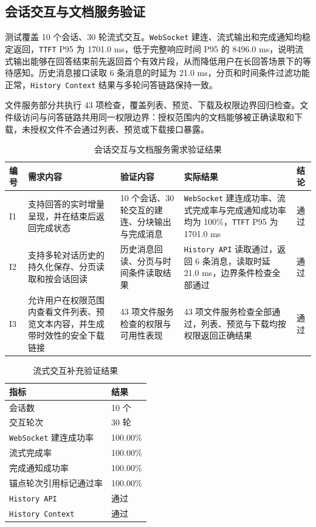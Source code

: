 \subsection{会话交互与文档服务验证}

测试覆盖 10 个会话、30 轮流式交互。\texttt{WebSocket} 建连、流式输出和完成通知均稳定返回，\texttt{TTFT} P95 为 1701.0 ms，低于完整响应时间 P95 的 8496.0 ms，说明流式输出能够在回答结束前先返回首个有效片段，从而降低用户在长回答场景下的等待感知。历史消息接口读取 6 条消息的时延为 21.0 ms，分页和时间条件过滤功能正常，\texttt{History Context} 结果与多轮问答链路保持一致。

文件服务部分共执行 43 项检查，覆盖列表、预览、下载及权限边界回归检查。文件级访问与问答链路共用同一权限边界：授权范围内的文档能够被正确读取和下载，未授权文件不会通过列表、预览或下载接口暴露。

\begin{table}[!htbp]
    \centering
    \caption{会话交互与文档服务需求验证结果}
    \label{tab:interaction-file-test}
    {\small
    \begin{tabularx}{\textwidth}{L{1.2cm}L{3.8cm}L{3.6cm}Y L{1.4cm}}
        \toprule
        编号 & 需求内容 & 验证内容 & 实际结果 & 结论 \\
        \midrule
        I1 & 支持回答的实时增量呈现，并在结束后返回完成状态 & 10 个会话、30 轮交互的建连、分块输出与完成消息 & \texttt{WebSocket} 建连成功率、流式完成率与完成通知成功率均为 100\%，\texttt{TTFT} P95 为 1701.0 ms & 通过 \\
        I2 & 支持多轮对话历史的持久化保存、分页读取和按会话回读 & 历史消息回读、分页与时间条件读取结果 & \texttt{History API} 读取通过，返回 6 条消息，读取时延 21.0 ms，边界条件检查全部通过 & 通过 \\
        I3 & 允许用户在权限范围内查看文件列表、预览文本内容，并生成带时效性的安全下载链接 & 43 项文件服务检查的权限与可用性表现 & 43 项文件服务检查全部通过，列表、预览与下载均按权限返回正确结果 & 通过 \\
        \bottomrule
    \end{tabularx}
    }
\end{table}

\begin{table}[!htbp]
    \centering
    \caption{流式交互补充验证结果}
    \label{tab:streaming-interaction-supplement-result}
    {\small
    \begin{tabularx}{\textwidth}{L{3.6cm}Y}
        \toprule
        指标 & 结果 \\
        \midrule
        会话数 & 10 个 \\
        交互轮次 & 30 轮 \\
        \texttt{WebSocket} 建连成功率 & 100.00\% \\
        流式完成率 & 100.00\% \\
        完成通知成功率 & 100.00\% \\
        锚点轮次引用标记通过率 & 100.00\% \\
        \texttt{History API} & 通过 \\
        \texttt{History Context} & 通过 \\
        \bottomrule
    \end{tabularx}
    }
\end{table}


